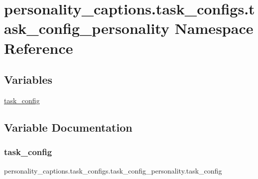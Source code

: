 \hypertarget{namespacepersonality__captions_1_1task__configs_1_1task__config__personality}{}\section{personality\+\_\+captions.\+task\+\_\+configs.\+task\+\_\+config\+\_\+personality Namespace Reference}
\label{namespacepersonality__captions_1_1task__configs_1_1task__config__personality}
\subsection*{Variables}
\begin{DoxyCompactItemize}
\item 
\hyperlink{namespacepersonality__captions_1_1task__configs_1_1task__config__personality_ae2d502818364171a28f8d13e6d6df8d1}{task\+\_\+config}
\end{DoxyCompactItemize}


\subsection{Variable Documentation}
\mbox{\label{namespacepersonality__captions_1_1task__configs_1_1task__config__personality_ae2d502818364171a28f8d13e6d6df8d1}} 
\subsubsection{\texorpdfstring{task\+\_\+config}{task\_config}}
{\footnotesize\ttfamily personality\+\_\+captions.\+task\+\_\+configs.\+task\+\_\+config\+\_\+personality.\+task\+\_\+config}

